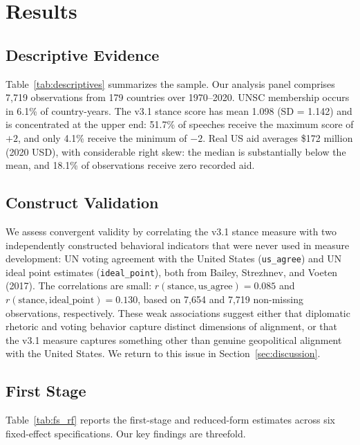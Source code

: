 \section{Results}\label{sec:results}

\subsection{Descriptive Evidence}

Table~\ref{tab:descriptives} summarizes the sample. Our analysis panel comprises 7,719 observations from 179 countries over 1970--2020. UNSC membership occurs in 6.1\% of country-years. The v3.1 stance score has mean 1.098 (SD = 1.142) and is concentrated at the upper end: 51.7\% of speeches receive the maximum score of $+2$, and only 4.1\% receive the minimum of $-2$. Real US aid averages \$172 million (2020 USD), with considerable right skew: the median is substantially below the mean, and 18.1\% of observations receive zero recorded aid.

\subsection{Construct Validation}

We assess convergent validity by correlating the v3.1 stance measure with two independently constructed behavioral indicators that were never used in measure development: UN voting agreement with the United States (\texttt{us\_agree}) and UN ideal point estimates (\texttt{ideal\_point}), both from Bailey, Strezhnev, and Voeten (2017). The correlations are small: $r(\text{stance}, \text{us\_agree}) = 0.085$ and $r(\text{stance}, \text{ideal\_point}) = 0.130$, based on 7,654 and 7,719 non-missing observations, respectively. These weak associations suggest either that diplomatic rhetoric and voting behavior capture distinct dimensions of alignment, or that the v3.1 measure captures something other than genuine geopolitical alignment with the United States. We return to this issue in Section~\ref{sec:discussion}.

\subsection{First Stage}



Table~\ref{tab:fs_rf} reports the first-stage and reduced-form estimates across six fixed-effect specifications. Our key findings are threefold.

